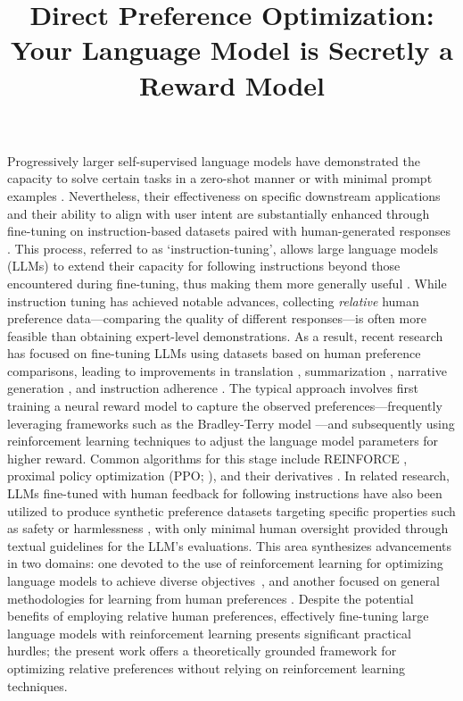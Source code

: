 \title{Direct Preference Optimization: Your Language Model is Secretly a Reward Model}
Progressively larger self-supervised language models have demonstrated the capacity to solve certain tasks in a zero-shot manner \citep{radford2019language} or with minimal prompt examples \citep{gpt3,megatron,chowdhery2022palm}. Nevertheless, their effectiveness on specific downstream applications and their ability to align with user intent are substantially enhanced through fine-tuning on instruction-based datasets paired with human-generated responses \citep{mishra-etal-2022-cross,sanh2022multitask,chung2022scaling,thoppilan2022lamda}. This process, referred to as `instruction-tuning', allows large language models (LLMs) to extend their capacity for following instructions beyond those encountered during fine-tuning, thus making them more generally useful \citep{chung2022scaling}. While instruction tuning has achieved notable advances, collecting \textit{relative} human preference data—comparing the quality of different responses—is often more feasible than obtaining expert-level demonstrations. As a result, recent research has focused on fine-tuning LLMs using datasets based on human preference comparisons, leading to improvements in translation \citep{kreutzer-etal-2018-reliability}, summarization \citep{stiennon2022learning,ziegler2020finetuning}, narrative generation \citep{ziegler2020finetuning}, and instruction adherence \citep{ouyang2022training,ramamurthy2023is}. The typical approach involves first training a neural reward model to capture the observed preferences—frequently leveraging frameworks such as the Bradley-Terry model \citep{bradley1952rankanalysis}—and subsequently using reinforcement learning techniques to adjust the language model parameters for higher reward. Common algorithms for this stage include REINFORCE \citep{williams1992reinforce}, proximal policy optimization (PPO; \cite{schulman2017proximal}), and their derivatives \citep{ramamurthy2023is}. In related research, LLMs fine-tuned with human feedback for following instructions have also been utilized to produce synthetic preference datasets targeting specific properties such as safety or harmlessness \citep{bai2022constitutional}, with only minimal human oversight provided through textual guidelines for the LLM’s evaluations. This area synthesizes advancements in two domains: one devoted to the use of reinforcement learning for optimizing language models to achieve diverse objectives~\citep{Ranzato2015SequenceLT,paulus2018a,wu2018learning}, and another focused on general methodologies for learning from human preferences \citep{christiano2017deep,kupcsik2018learning}. Despite the potential benefits of employing relative human preferences, effectively fine-tuning large language models with reinforcement learning presents significant practical hurdles; the present work offers a theoretically grounded framework for optimizing relative preferences without relying on reinforcement learning techniques.

